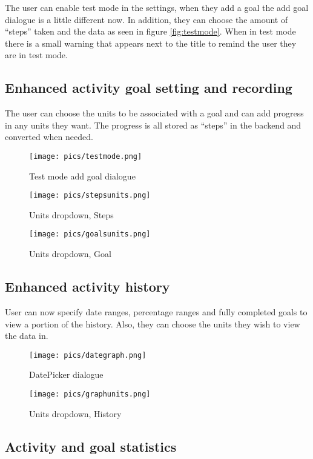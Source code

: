 \documentclass[12pt]{report}
\begin{document}
The user can enable test mode in the settings, when they add a goal the add goal dialogue is a little different now. In addition, they can choose the amount of ``steps'' taken and the data as seen in figure \ref{fig:testmode}. When in test mode there is a small warning that appears next to the title to remind the user they are in test mode.


\subsection{Enhanced activity goal setting and recording}

The user can choose the units to be associated with a goal and can add progress in any units they want. The progress is all stored as ``steps'' in the backend and converted when needed.

\begin{figure}[!htb]
  \texttt{[image: pics/testmode.png]}
  \caption{Test mode add goal dialogue}
  \label{fig:testmode}
\endminipage\hfill
{}
  \texttt{[image: pics/stepsunits.png]}
  \caption{Units dropdown, Steps}
  \label{fig:stepsunits}
\endminipage\hfill
{}
  \texttt{[image: pics/goalsunits.png]}
  \caption{Units dropdown, Goal}\label{fig:goalsunits}
\endminipage
\end{figure}

\subsection{Enhanced activity history}

User can now specify date ranges, percentage ranges and fully completed goals to view a portion of the history. Also, they can choose the units they wish to view the data in.

\begin{figure}[!htb]
  \texttt{[image: pics/dategraph.png]}
  \caption{DatePicker dialogue}
  \label{fig:dategraph}
\endminipage\hfill
{}
  \texttt{[image: pics/graphunits.png]}
  \caption{Units dropdown, History}\label{fig:graphunits}
\endminipage
\end{figure}

\subsection{Activity and goal statistics}
\end{document}
